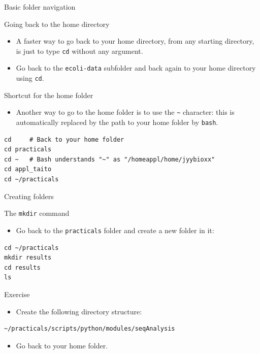 \documentclass[big]{beamer}
\begin{document}
\begin{frame}[fragile,label=sec-2-18]{Basic folder navigation}
 \begin{block}{Going back to the home directory}
\begin{itemize}
\item A faster way to go back to your home directory, from any starting directory,
is just to type \texttt{cd} without any argument.
\item Go back to the \texttt{ecoli-data} subfolder and back again to your home directory
using \texttt{cd}.
\end{itemize}
\end{block}
\begin{block}{Shortcut for the home folder}
\begin{itemize}
\item Another way to go to the home folder is to use the \texttt{\textasciitilde{}} character: this is
automatically replaced by the path to your home folder by \texttt{bash}.
\end{itemize}
\begin{verbatim}
cd     # Back to your home folder
cd practicals
cd ~   # Bash understands "~" as "/homeappl/home/jyybioxx"
cd appl_taito
cd ~/practicals
\end{verbatim}
\end{block}
\end{frame}
\begin{frame}[fragile,label=sec-2-19]{Creating folders}
 \begin{block}{The \texttt{mkdir} command}
\begin{itemize}
\item Go back to the \texttt{practicals} folder and create a new folder in it:
\end{itemize}
\begin{verbatim}
cd ~/practicals
mkdir results
cd results
ls
\end{verbatim}
\end{block}
\begin{block}{Exercise}
\begin{itemize}
\item Create the following directory structure:
\end{itemize}
\begin{verbatim}
~/practicals/scripts/python/modules/seqAnalysis
\end{verbatim}
\begin{itemize}
\item Go back to your home folder.
\end{itemize}
\end{block}
\end{frame}
\end{document}
